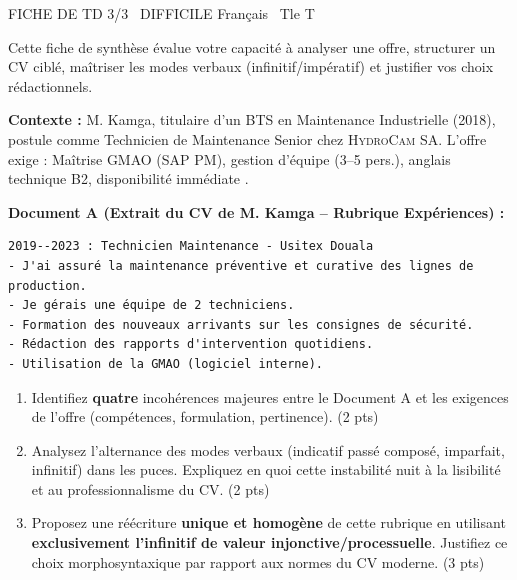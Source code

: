 \documentclass[11pt]{article}
\begin{document}
\begin{tcolorbox}[enhanced,colback=popink,colframe=popink,arc=10pt,boxrule=0pt,left=12pt,right=12pt,top=9pt,bottom=9pt]
{\color{white}\popxbold\small FICHE DE TD 3/3 \textbullet\ DIFFICILE \hfill Français \textbullet\ Tle T\par}
\end{tcolorbox}
\vspace{4pt}
\noindent Cette fiche de synthèse évalue votre capacité à analyser une offre, structurer un CV ciblé, maîtriser les modes verbaux (infinitif/impératif) et justifier vos choix rédactionnels.

\begin{exercice}
\textbf{Contexte :} M. Kamga, titulaire d'un BTS en Maintenance Industrielle (2018), postule comme \og Technicien de Maintenance Senior \fg{} chez \textsc{HydroCam SA}. L'offre exige : \og Maîtrise GMAO (SAP PM), gestion d'équipe (3--5 pers.), anglais technique B2, disponibilité immédiate \fg{}.

\textbf{Document A (Extrait du CV de M. Kamga -- Rubrique Expériences) :}
\begin{verbatim}
2019--2023 : Technicien Maintenance - Usitex Douala
- J'ai assuré la maintenance préventive et curative des lignes de production.
- Je gérais une équipe de 2 techniciens.
- Formation des nouveaux arrivants sur les consignes de sécurité.
- Rédaction des rapports d'intervention quotidiens.
- Utilisation de la GMAO (logiciel interne).
\end{verbatim}

\begin{enumerate}
    \item Identifiez \textbf{quatre} incohérences majeures entre le Document A et les exigences de l'offre (compétences, formulation, pertinence). (2 pts)
    \item Analysez l'alternance des modes verbaux (indicatif passé composé, imparfait, infinitif) dans les puces. Expliquez en quoi cette instabilité nuit à la lisibilité et au professionnalisme du CV. (2 pts)
    \item Proposez une réécriture \textbf{unique et homogène} de cette rubrique en utilisant \textbf{exclusivement l'infinitif de valeur injonctive/processuelle}. Justifiez ce choix morphosyntaxique par rapport aux normes du CV moderne. (3 pts)
\end{enumerate}
\end{exercice}
\end{document}
